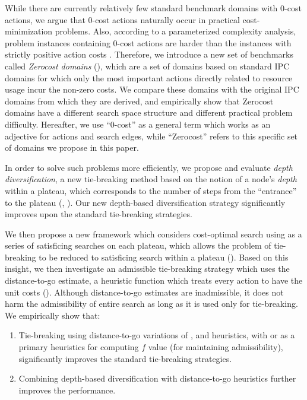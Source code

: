 While there are currently relatively few standard benchmark domains with 0-cost actions,
we argue that 0-cost actions naturally occur in
practical cost-minimization problems.
Also, according to a parameterized complexity analysis, problem instances containing 0-cost actions are harder than the instances with strictly positive action costs \cite{aghighi2015}.
Therefore, we introduce a new set of benchmarks called \emph{Zerocost domains}
(), which are a set of domains based on standard IPC domains for which only the most important actions directly related to resource usage incur the non-zero costs.
We compare these domains with the original IPC domains from which they are derived, and empirically show that 
Zerocost domains have a different search space structure and different practical problem difficulty.
Hereafter, we use ``0-cost'' as a general term which works as an adjective for actions and search edges, while ``Zerocost'' refers to this specific set of domains we propose in this paper.

In order to solve such problems more efficiently, we propose and
evaluate \emph{depth diversification}, a new
tie-breaking method based on the notion of a node's \emph{depth} within a plateau,
which corresponds to the number of steps from the ``entrance'' to
the plateau (,
). 
Our new depth-based diversification strategy significantly improves upon the 
standard tie-breaking strategies.

We then propose a new framework which considers cost-optimal search using \astar 
as a series of satisficing searches on each plateau,
which allows the problem of tie-breaking to be reduced to satisficing search within a plateau ().
Based on this insight, we then investigate an
admissible tie-breaking strategy which uses the distance-to-go estimate, a heuristic function which treats every action
to have the unit costs ().
Although distance-to-go estimates are inadmissible,
it does not harm the admissibility of entire search as long as it is used only for tie-breaking.
% 
We empirically show that:
\begin{enumerate}
 \item Tie-breaking using distance-to-go variations of \lmcut, \mands and \ff heuristics,
       with \lmcut or \mands as a primary heuristics for computing $f$ value (for maintaining admissibility),
       significantly improves the standard tie-breaking strategies.
 \item Combining depth-based diversification with distance-to-go heuristics 
       further improves the performance.
\end{enumerate}


